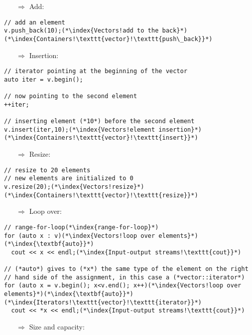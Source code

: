 \documentclass[10pt]{article}
\begin{document}
\begin{enumerate}
\item[$\Rightarrow$] Add:
\end{enumerate}
\begin{lstlisting}
// add an element
v.push_back(10);(*\index{Vectors!add to the back}*)(*\index{Containers!\texttt{vector}!\texttt{push\_back}}*)
\end{lstlisting}
\begin{enumerate}
\item[$\Rightarrow$] Insertion:
\end{enumerate}
\begin{lstlisting}
// iterator pointing at the beginning of the vector
auto iter = v.begin();

// now pointing to the second element
++iter;

// inserting element (*10*) before the second element
v.insert(iter,10);(*\index{Vectors!element insertion}*)(*\index{Containers!\texttt{vector}!\texttt{insert}}*)
\end{lstlisting}
\begin{enumerate}
\item[$\Rightarrow$] Resize:
\end{enumerate}
\begin{lstlisting}
// resize to 20 elements
// new elements are initialized to 0
v.resize(20);(*\index{Vectors!resize}*)(*\index{Containers!\texttt{vector}!\texttt{resize}}*)
\end{lstlisting}
\begin{enumerate}
\item[$\Rightarrow$] Loop over:
\end{enumerate}
\begin{lstlisting}
// range-for-loop(*\index{range-for-loop}*)
for (auto x : v)(*\index{Vectors!loop over elements}*)(*\index{\textbf{auto}}*)
  cout << x << endl;(*\index{Input-output streams!\texttt{cout}}*)

// (*auto*) gives to (*x*) the same type of the element on the right
// hand side of the assignment, in this case a (*vector::iterator*)
for (auto x = v.begin(); x<v.end(); x++)(*\index{Vectors!loop over elements}*)(*\index{\textbf{auto}}*)(*\index{Iterators!\texttt{vector}!\texttt{iterator}}*)
  cout << *x << endl;(*\index{Input-output streams!\texttt{cout}}*)
\end{lstlisting}
\begin{enumerate}
\item[$\Rightarrow$] Size and capacity:
\end{enumerate}
\end{document}
